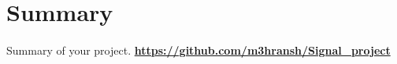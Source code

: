 \section*{Summary}
\paragraph{}
Summary of your project.
\newline
\newline
\href{https://github.com/m3hransh}{\textbf{https://github.com/m3hransh/Signal\_project}}